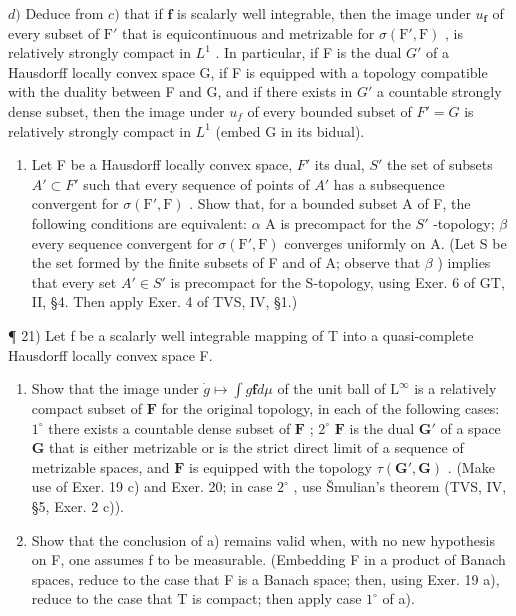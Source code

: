 \(d)\) Deduce from \(c)\) that if \(\mathbf{f}\) is scalarly well integrable, then the image under \(u_{\mathbf{f}}\) of every subset of \(\mathrm{F}'\) that is equicontinuous and metrizable for \(\sigma (\mathrm{F}',\mathrm{F})\) , is relatively strongly compact in \(L^{1}\) . In particular, if F is the dual \(G'\) of a Hausdorff locally convex space G, if F is equipped with a topology compatible with the duality between F and G, and if there exists in \(G'\) a countable strongly dense subset, then the image under \(u_{f}\) of every bounded subset of \(F' = G\) is relatively strongly compact in \(L^{1}\) (embed G in its bidual).

\begin{enumerate}
\def\labelenumi{\arabic{enumi})}
\setcounter{enumi}{19}
\tightlist
\item
  Let F be a Hausdorff locally convex space, \(F'\) its dual, \(S'\) the set of subsets \(A' \subset F'\) such that every sequence of points of \(A'\) has a subsequence convergent for \(\sigma(\mathrm{F}',\mathrm{F})\) . Show that, for a bounded subset A of F, the following conditions are equivalent: \(\alpha\) A is precompact for the \(S'\) -topology; \(\beta\) every sequence convergent for \(\sigma(\mathrm{F}',\mathrm{F})\) converges uniformly on A. (Let S be the set formed by the finite subsets of F and of A; observe that \(\beta\) ) implies that every set \(A' \in S'\) is precompact for the S-topology, using Exer. 6 of GT, II, §4. Then apply Exer. 4 of TVS, IV, §1.)
\end{enumerate}

¶ 21) Let f be a scalarly well integrable mapping of T into a quasi-complete Hausdorff locally convex space F.

\begin{enumerate}
\def\labelenumi{\alph{enumi})}
\item
  Show that the image under \(\dot{g} \mapsto \int g\mathbf{f}  d\mu\) of the unit ball of \(\mathrm{L}^{\infty}\) is a relatively compact subset of \(\mathbf{F}\) for the original topology, in each of the following cases: \(1^{\circ}\) there exists a countable dense subset of \(\mathbf{F}\) ; \(2^{\circ}\) \(\mathbf{F}\) is the dual \(\mathbf{G}'\) of a space \(\mathbf{G}\) that is either metrizable or is the strict direct limit of a sequence of metrizable spaces, and \(\mathbf{F}\) is equipped with the topology \(\tau (\mathbf{G}',\mathbf{G})\) . (Make use of Exer. 19 c) and Exer. 20; in case \(2^{\circ}\) , use Šmulian's theorem (TVS, IV, §5, Exer. 2 c)).
\item
  Show that the conclusion of a) remains valid when, with no new hypothesis on F, one assumes f to be measurable. (Embedding F in a product of Banach spaces, reduce to the case that F is a Banach space; then, using Exer. 19 a), reduce to the case that T is compact; then apply case \(1^{\circ}\) of a).
\end{enumerate}

